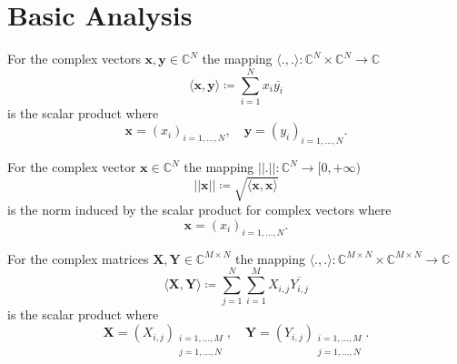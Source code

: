 \section{Basic Analysis}
\begin{Def}\label{def:scalar_product_complex_vectors}
    For the complex vectors $\boldsymbol{x},\boldsymbol{y} \in \mathbb{C}^N$ the mapping  $\langle\boldsymbol{.},\boldsymbol{.}\rangle \colon \mathbb{C}^N \times \mathbb{C}^N \to \mathbb{C}$ 
    \begin{equation}
        \langle\boldsymbol{x},\boldsymbol{y}\rangle \coloneqq \sum_{i=1}^{N} x_i \overline{y_i} 
    \end{equation}
    is the scalar product where
    \begin{equation}
        \boldsymbol{x} = \left(x_i\right)_{i=1,\ldots,N}, \quad \boldsymbol{y} = \left(y_i\right)_{i=1,\ldots,N}.
    \end{equation}    
\end{Def}
\begin{Def}\label{def:scalar_product_induced_norm_complex_vectors}
    For the complex vector $\boldsymbol{x} \in \mathbb{C}^N$ the mapping  $\left|\left|\boldsymbol{.}\right|\right| \colon \mathbb{C}^N \to [0,+\infty)$ 
    \begin{equation}
        \left|\left|\boldsymbol{x}\right|\right| \coloneqq  \sqrt{\langle\boldsymbol{x},\boldsymbol{x}\rangle}
    \end{equation}
    is the norm induced by the scalar product for complex vectors where
    \begin{equation}
        \boldsymbol{x} = \left(x_i\right)_{i=1,\ldots,N}.
    \end{equation}    
\end{Def}
\begin{Def}\label{def:scalar_product_induced_norm_complex_matrices}
    For the complex matrices $\boldsymbol{X},\boldsymbol{Y} \in \mathbb{C}^{M \times N}$ the mapping $\langle\boldsymbol{.},\boldsymbol{.}\rangle \colon \mathbb{C}^{M \times N} \times \mathbb{C}^{M \times N} \to \mathbb{C}$ 
    \begin{equation}
        \langle\boldsymbol{X},\boldsymbol{Y}\rangle \coloneqq \sum_{j=1}^{N}\sum_{i=1}^{M} X_{i,j} \overline{Y_{i,j}} 
    \end{equation}
    is the scalar product where
    \begin{equation}
        \boldsymbol{X} = \left(X_{i,j}\right)_{\substack{i=1,\ldots,M\\ j=1,\ldots,N}}, \quad \boldsymbol{Y} = \left(Y_{i,j}\right)_{\substack{i=1,\ldots,M\\ j=1,\ldots,N}}.
    \end{equation}    
\end{Def}

